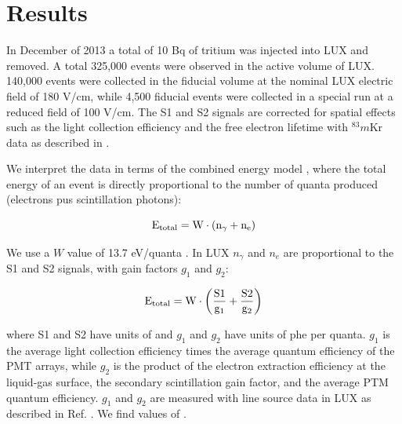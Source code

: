 \section{Results}

In December of 2013 a total of 10 Bq of tritium was injected into LUX and removed. A total 325,000 events were observed in the active volume of LUX. 140,000 events were collected in the fiducial volume at the nominal LUX electric field of 180 V/cm, while 4,500 fiducial events were collected in a special run at a reduced field of 100 V/cm. The S1 and S2 signals are corrected for spatial effects such as the light collection efficiency and the free electron lifetime with $^83m$Kr data as described in \cite{lux-reanalysis}. 

We interpret the data in terms of the combined energy model \cite{platzman}, where the total energy of an event is directly proportional to the number of quanta produced (electrons pus scintillation photons):

\begin{displaymath}
\rm E_{total} = W \cdot (n_{\gamma} + n_e )
\end{displaymath}

\noindent
We use a $W$ value of 13.7 eV/quanta \cite{Dahl_Thesis}. In LUX $n_{\gamma}$ and $n_e$ are proportional to the S1 and S2 signals, with gain factors $g_1$ and $g_2$:

\begin{displaymath}
\rm E_{total} = W \cdot \left(\frac{S1}{g_1} + \frac{S2}{g_2} \right)
\end{displaymath}

\noindent
where S1 and S2 have units of  and $g_1$ and $g_2$ have units of phe per quanta. $g_1$ is the average light collection efficiency times the average quantum efficiency of the PMT arrays, while $g_2$ is the product of the electron extraction efficiency at the liquid-gas surface, the secondary scintillation gain factor, and the average PTM quantum efficiency. $g_1$ and $g_2$ are measured with line source data in LUX as described in Ref. \cite{lux-reanalysis, lux-prd}. We find values of .


